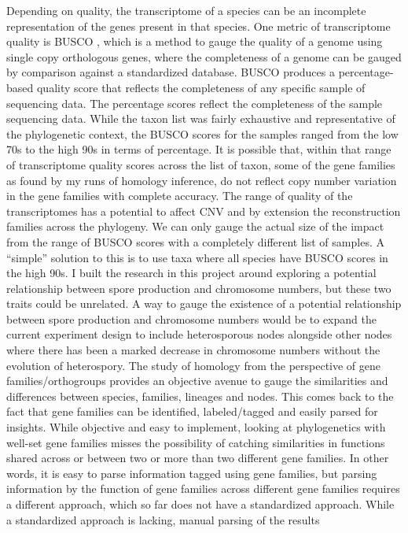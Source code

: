 Depending on quality, the transcriptome of a species can be an incomplete representation
of the genes present in that species. One metric of transcriptome quality is BUSCO \cite{Simao2015-xq}, which is a method to gauge the quality of a genome using single copy orthologous genes,
where the completeness of a genome can be gauged by comparison against a standardized
database. BUSCO produces a percentage-based quality score that reflects the completeness of
any specific sample of sequencing data. The percentage scores reflect the completeness of the
sample sequencing data. While the taxon list was fairly exhaustive and representative of the
phylogenetic context, the BUSCO scores for the samples ranged from the low 70s to the high 90s
in terms of percentage. It is possible that, within that range of transcriptome quality scores across
the list of taxon, some of the gene families as found by my runs of homology inference, do not
reflect copy number variation in the gene families with complete accuracy. The range of quality
of the transcriptomes has a potential to affect CNV and by extension the reconstruction families
across the phylogeny. We can only gauge the actual size of the impact from the range of BUSCO
scores with a completely different list of samples. A “simple” solution to this is to use taxa where
all species have BUSCO scores in the high 90s.
I built the research in this project around exploring a potential relationship between spore
production and chromosome numbers, but these two traits could be unrelated. A way to gauge
the existence of a potential relationship between spore production and chromosome numbers
would be to expand the current experiment design to include heterosporous nodes alongside
other nodes where there has been a marked decrease in chromosome numbers without the
evolution of heterospory.
The study of homology from the perspective of gene families/orthogroups provides an
objective avenue to gauge the similarities and differences between species, families, lineages and
nodes. This comes back to the fact that gene families can be identified, labeled/tagged and easily
parsed for insights. While objective and easy to implement, looking at phylogenetics with
well-set gene families misses the possibility of catching similarities in functions shared across or
between two or more than two different gene families. In other words, it is easy to parse
information tagged using gene families, but parsing information by the function of gene families
across different gene families requires a different approach, which so far does not have a
standardized approach. While a standardized approach is lacking, manual parsing of the results
